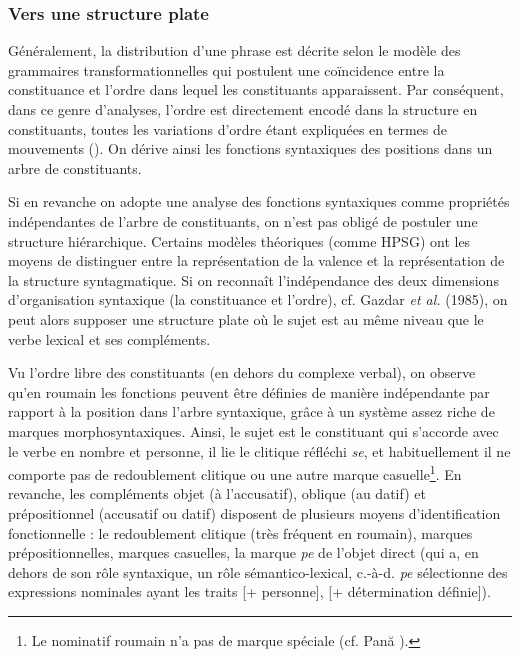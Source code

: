 \subsubsection{Vers une structure plate} 
\label{bkm:Ref299284285}Généralement, la distribution d'une phrase est décrite selon le modèle des grammaires transformationnelles qui postulent une coïncidence entre la constituance et l'ordre dans lequel les constituants apparaissent. Par conséquent, dans ce genre d'analyses, l'ordre est directement encodé dans la structure en constituants, toutes les variations d'ordre étant expliquées en termes de mouvements (\citet{Kayne1994}). On dérive ainsi les fonctions syntaxiques des positions dans un arbre de constituants.

Si en revanche on adopte une analyse des fonctions syntaxiques comme propriétés indépendantes de l'arbre de constituants, on n'est pas obligé de postuler une structure hiérarchique. Certains modèles théoriques (comme HPSG) ont les moyens de distinguer entre la représentation de la valence et la représentation de la structure syntagmatique. Si on reconnaît l'indépendance des deux dimensions d'organisation syntaxique (la constituance et l'ordre), cf. Gazdar \textit{et al.} (1985), on peut alors supposer une structure plate où le sujet est au même niveau que le verbe lexical et ses compléments. 

Vu l'ordre libre des constituants (en dehors du complexe verbal), on observe qu'en roumain les fonctions peuvent être définies de manière indépendante par rapport à la position dans l'arbre syntaxique, grâce à un système assez riche de marques morphosyntaxiques. Ainsi, le sujet est le constituant qui s'accorde avec le verbe en nombre et personne, il lie le clitique réfléchi \textit{se}, et habituellement il ne comporte pas de redoublement clitique ou une autre marque casuelle\footnote{Le nominatif roumain n'a pas de marque spéciale (cf. Pană \citet{Dindelegan2003}).}. En revanche, les compléments objet (à l'accusatif), oblique (au datif) et prépositionnel (accusatif ou datif) disposent de plusieurs moyens d'identification fonctionnelle : le redoublement clitique (très fréquent en roumain), marques prépositionnelles, marques casuelles, la marque \textit{pe} de l'objet direct (qui a, en dehors de son rôle syntaxique, un rôle sémantico-lexical, c.-à-d. \textit{pe} sélectionne des expressions nominales ayant les traits [+ personne], [+ détermination définie]).

